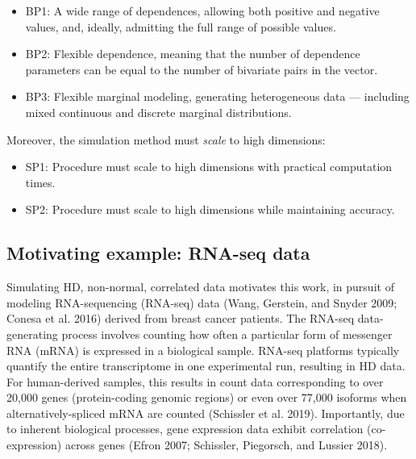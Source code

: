 \documentclass{article}
\begin{document}
\begin{itemize}
\tightlist
\item
  BP1: A wide range of dependences, allowing both positive and negative
  values, and, ideally, admitting the full range of possible values.
\item
  BP2: Flexible dependence, meaning that the number of dependence
  parameters can be equal to the number of bivariate pairs in the
  vector.
\item
  BP3: Flexible marginal modeling, generating heterogeneous data ---
  including mixed continuous and discrete marginal distributions.
\end{itemize}

Moreover, the simulation method must \emph{scale} to high dimensions:

\begin{itemize}
\tightlist
\item
  SP1: Procedure must scale to high dimensions with practical
  computation times.
\item
  SP2: Procedure must scale to high dimensions while maintaining
  accuracy.
\end{itemize}

\hypertarget{motivating-example-rna-seq-data}{%
\subsection{Motivating example: RNA-seq
data}\label{motivating-example-rna-seq-data}}

Simulating HD, non-normal, correlated data motivates this work, in
pursuit of modeling RNA-sequencing (RNA-seq) data (Wang, Gerstein, and
Snyder 2009; Conesa et al. 2016) derived from breast cancer patients.
The RNA-seq data-generating process involves counting how often a
particular form of messenger RNA (mRNA) is expressed in a biological
sample. RNA-seq platforms typically quantify the entire transcriptome in
one experimental run, resulting in HD data. For human-derived samples,
this results in count data corresponding to over 20,000 genes
(protein-coding genomic regions) or even over 77,000 isoforms when
alternatively-spliced mRNA are counted (Schissler et al. 2019).
Importantly, due to inherent biological processes, gene expression data
exhibit correlation (co-expression) across genes (Efron 2007; Schissler,
Piegorsch, and Lussier 2018).
\end{document}
